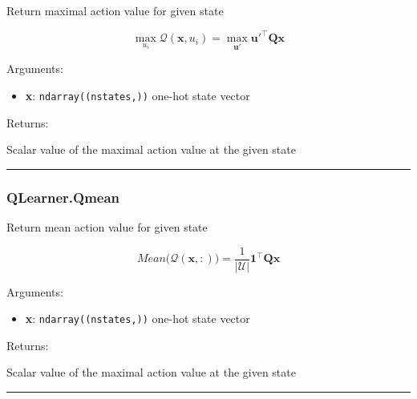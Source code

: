 \begin{Shaded}
\begin{Highlighting}[]
\end{Highlighting}
\end{Shaded}

Return maximal action value for given state

\[
\max_{u_i}\mathcal Q(\mathbf x, u_i) = \max_{\mathbf u'} \mathbf u'^\top \mathbf Q \mathbf x
\]

Arguments:

\begin{itemize}
\tightlist
\item
  \textbf{x}: \texttt{ndarray((nstates,))} one-hot state vector
\end{itemize}

Returns:

Scalar value of the maximal action value at the given state

\begin{center}\rule{0.5\linewidth}{\linethickness}\end{center}

\hypertarget{qlearner.qmean}{%
\subsubsection{QLearner.Qmean}\label{qlearner.qmean}}

\begin{Shaded}
\begin{Highlighting}[]
\end{Highlighting}
\end{Shaded}

Return mean action value for given state

\[
Mean \big(\mathcal Q(\mathbf x, :)\big) = \frac{1}{|\mathcal U|} \mathbf 1^\top \mathbf Q \mathbf x
\]

Arguments:

\begin{itemize}
\tightlist
\item
  \textbf{x}: \texttt{ndarray((nstates,))} one-hot state vector
\end{itemize}

Returns:

Scalar value of the maximal action value at the given state

\begin{center}\rule{0.5\linewidth}{\linethickness}\end{center}

